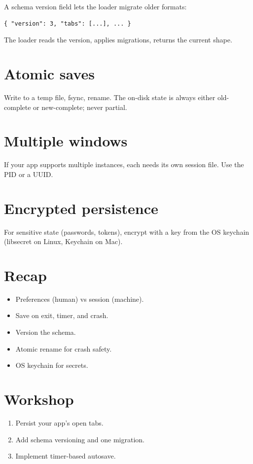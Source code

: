 A schema version field lets the loader migrate older
formats:

\begin{lstlisting}
{ "version": 3, "tabs": [...], ... }
\end{lstlisting}

The loader reads the version, applies migrations, returns
the current shape.

\section{Atomic saves}

Write to a temp file, fsync, rename. The on-disk state is
always either old-complete or new-complete; never partial.

\section{Multiple windows}

If your app supports multiple instances, each needs its own
session file. Use the PID or a UUID.

\section{Encrypted persistence}

For sensitive state (passwords, tokens), encrypt with a
key from the OS keychain (libsecret on Linux, Keychain on
Mac).

\section{Recap}

\begin{recap}
\begin{itemize}[leftmargin=*]
  \item Preferences (human) vs session (machine).
  \item Save on exit, timer, and crash.
  \item Version the schema.
  \item Atomic rename for crash safety.
  \item OS keychain for secrets.
\end{itemize}
\end{recap}

\section*{Workshop}

\begin{enumerate}[leftmargin=*]
  \item Persist your app's open tabs.
  \item Add schema versioning and one migration.
  \item Implement timer-based autosave.
\end{enumerate}
